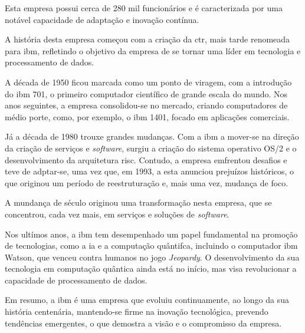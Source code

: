 \documentclass{report}
\begin{document}
    Esta empresa possui cerca de 280 mil funcionários e é caracterizada por uma notável capacidade de adaptação e inovação contínua. 
    
    A história desta empresa começou com a criação da \ac{ctr}, mais tarde renomeada para \ac{ibm}, refletindo o objetivo da empresa de se tornar uma líder em tecnologia e processamento de dados.
    
    A década de 1950 ficou marcada como um ponto de viragem, com a introdução do \ac{ibm} 701, o primeiro computador científico de grande escala do mundo. Nos anos seguintes, a empresa consolidou-se no mercado, criando computadores de médio porte, como, por exemplo, o \ac{ibm} 1401, focado em aplicações comerciais.

    Já a década de 1980 trouxe grandes mudanças. Com a \ac{ibm} a mover-se na direção da criação de serviços e \textit{software}, surgiu a criação do sistema operativo OS/2 e o desenvolvimento da arquitetura \ac{risc}. Contudo, a empresa emfrentou desafios e teve de adptar-se, uma vez que, em 1993, a esta anunciou prejuízos históricos, o que originou um período de reestruturação e, mais uma vez, mudança de foco.

    A mundança de século originou uma transformação nesta empresa, que se concentrou, cada vez mais, em serviços e soluções de \textit{software}. 

    Nos ultímos anos, a \ac{ibm} tem desempenhado um papel fundamental na promoção de tecnologias, como a \ac{ia} e a computação quântifca, incluindo o computador \ac{ibm} Watson, que venceu contra humanos no jogo \textit{Jeopardy}. O desenvolvimento da sua tecnologia em computação quântica ainda está no início, mas visa revolucionar a capacidade de processamento de dados.

    Em resumo, a \ac{ibm} é uma empresa que evoluiu continuamente, ao longo da sua história centenária, mantendo-se firme na inovação tecnológica, prevendo tendências emergentes, o que demostra a visão e o compromisso da empresa.
    
\end{document}
